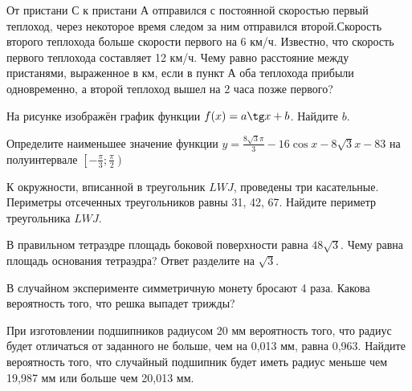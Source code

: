 \documentclass[twocolumn]{article}
\begin{document}
\begin{taskBN}{9}
От пристани С к пристани А  отправился с постоянной скоростью первый теплоход, через некоторое время следом за ним отправился второй.Скорость второго теплохода больше скорости первого на 6 км/ч. Известно, что скорость первого теплохода составляет 12 км/ч. Чему равно расстояние между пристанями, выраженное в км, если в пункт А оба теплохода прибыли одновременно, а второй теплоход вышел на 2 часа позже первого? 
\end{taskBN}

\begin{taskBN}{10}
На рисунке изображён график функции $f(x)=a\tg x+b$. Найдите $b$.\vspace{2.5cm}
\end{taskBN}

\begin{taskBN}{11}
Определите наименьшее значение функции $y =\frac{8\sqrt{3}\pi}{3}-16\cos x-8\sqrt{3}x-83$ на полуинтервале $\left[-\frac{\pi}{3};\frac{\pi}{2} \right)$
\end{taskBN}




\cleardoublepage
\def\examvart{Вариант 19.2}
\normalsize

\startpartone
\large




\begin{taskBN}{1}
К окружности, вписанной в треугольник $LWJ$, проведены три касательные. Периметры отсеченных треугольников равны 31, 42, 67. Найдите периметр треугольника $LWJ$.
\end{taskBN}

\begin{taskBN}{2}
В правильном тетраэдре площадь боковой поверхности равна $48\sqrt{3}$. Чему равна площадь основания тетраэдра? Ответ разделите на $\sqrt{3}$.\vspace{2.5cm}
\end{taskBN}

\begin{taskBN}{3}
В случайном эксперименте симметричную монету бросают 4 раза. Какова вероятность того, что решка выпадет трижды?
\end{taskBN}

\begin{taskBN}{4}
При изготовлении подшипников радиусом 20 мм вероятность того, что радиус будет отличаться от заданного не больше, чем на 0,013 мм, равна 0,963. Найдите вероятность того, что случайный подшипник будет иметь радиус меньше чем 19,987 мм или больше чем 20,013 мм.
\end{taskBN}
\end{document}
